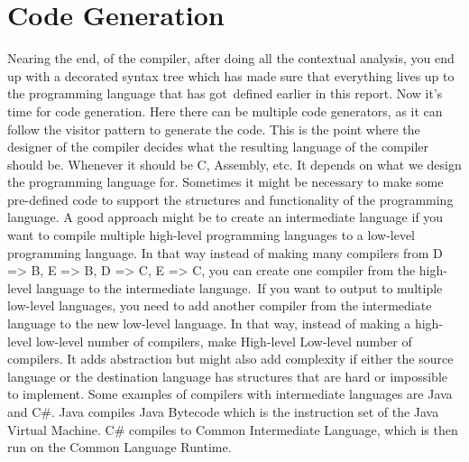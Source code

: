 \section{Code Generation}
Nearing the end, of the compiler, after doing all the contextual analysis, you end up with a decorated syntax tree which has made sure that everything lives up to the programming language that has got defined earlier in this report. Now it’s time for code generation.
Here there can be multiple code generators, as it can follow the visitor pattern to generate the code. This is the point where the designer of the compiler decides what the resulting language of the compiler should be. Whenever it should be C, Assembly, etc. It depends on what we design the programming language for. Sometimes it might be necessary to make some pre-defined code to support the structures and functionality of the programming language.
A good approach might be to create an intermediate language if you want to compile multiple high-level programming languages to a low-level programming language. In that way instead of making many compilers from D => B, E => B, D => C, E => C, you can create one compiler from the high-level language to the intermediate language. If you want to output to multiple low-level languages, you need to add another compiler from the intermediate language to the new low-level language. In that way, instead of making a high-level \* low-level number of compilers, make High-level \+ Low-level number of compilers. It adds abstraction but might also add complexity if either the source language or the destination language has structures that are hard or impossible to implement. Some examples of compilers with intermediate languages are Java and C\#. Java compiles Java Bytecode which is the instruction set of the Java Virtual Machine. C\# compiles to Common Intermediate Language, which is then run on the Common Language Runtime.